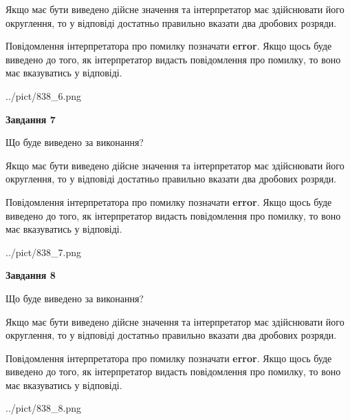\documentclass[12pt, ukrainian]{article}
\begin{document}
{\begin {Large}
Якщо має бути виведено дійсне значення та інтерпретатор має здійснювати його округлення, 
то у відповіді достатньо правильно вказати два дробових розряди.

Повідомлення інтерпретатора про помилку позначати \textbf{error}.
Якщо щось буде виведено до того, як інтерпретатор видасть повідомлення про помилку, 
то воно має вказуватись у відповіді. \par

\begin{center}
	{../pict/838_6.png}
\end{center}
\newpage

{\begin {center}\textbf{Завдання 7}\end {center}}\par
Що буде виведено за виконання? \par

Якщо має бути виведено дійсне значення та інтерпретатор має здійснювати його округлення, 
то у відповіді достатньо правильно вказати два дробових розряди.

Повідомлення інтерпретатора про помилку позначати \textbf{error}.
Якщо щось буде виведено до того, як інтерпретатор видасть повідомлення про помилку, 
то воно має вказуватись у відповіді. \par

\begin{center}
	{../pict/838_7.png}
\end{center}
\newpage

{\begin {center}\textbf{Завдання 8}\end {center}}\par
Що буде виведено за виконання? \par

Якщо має бути виведено дійсне значення та інтерпретатор має здійснювати його округлення, 
то у відповіді достатньо правильно вказати два дробових розряди.

Повідомлення інтерпретатора про помилку позначати \textbf{error}.
Якщо щось буде виведено до того, як інтерпретатор видасть повідомлення про помилку, 
то воно має вказуватись у відповіді. \par

\begin{center}
	{../pict/838_8.png}
\end{center}
\newpage


\end{Large}}
\end{document}
